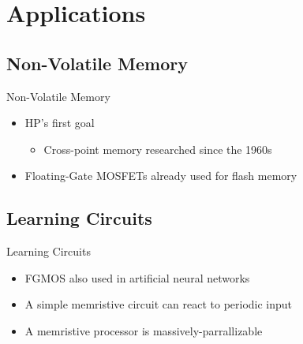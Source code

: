 \documentclass{beamer}
\begin{document}
\section{Applications}

\subsection{Non-Volatile Memory}

\begin{frame}{Non-Volatile Memory}
  \begin{itemize}
  \item HP's first goal
    \begin{itemize}
    \item Cross-point memory researched since the 1960s
    \end{itemize}
  \item Floating-Gate MOSFETs already used for flash memory
  \end{itemize}
\end{frame}

\subsection{Learning Circuits}

\begin{frame}{Learning Circuits}
  \begin{itemize}
  \item FGMOS also used in artificial neural networks
  \item A simple memristive circuit can react to periodic input
  \item A memristive processor is massively-parrallizable
  \end{itemize}
\end{frame}



\end{document}
